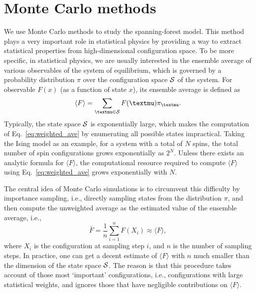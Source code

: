 \section{Monte Carlo methods}\label{sec:MC_intro}
We use Monte Carlo methods to study the spanning-forest model. This method plays a very important role in statistical physics by
providing a way to extract statistical properties from high-dimensional configuration space. To be more specific, in statistical
physics, we are usually interested in the ensemble average of various observables of the system of equilibrium, which is governed by a probability distribution $\pi$ over the configuration space ${\mathcal S}$ of the system. 
For observable $F(x)$ (as a function of state $x$), its ensemble average is defined as
\begin{equation}\label{eq:weighted_ave}
	\langle F \rangle = \sum_{\mu \in \scrS} F(\mu) \pi_\mu.
\end{equation}
Typically, the state space ${\mathcal S}$ is exponentially large, which makes the computation of Eq.~\eqref{eq:weighted_ave} by enumerating all possible states impractical.
Taking the Ising model as an example, for a system with a total of $N$ spins, the total number of spin configurations grows exponentially as $2^N$.
Unless there exists an analytic formula for $\langle F \rangle$, the computational resource required to compute $\langle F \rangle$ 
using Eq.~\eqref{eq:weighted_ave} grows exponentially with $N$.

The central idea of Monte Carlo simulations is to circumvent this difficulty by importance sampling, i.e., directly sampling states from the distribution
$\pi$, and then compute the unweighted average as the estimated value of the ensemble average, i.e.,
\begin{equation}
	\bar{F} = \frac{1}{n}\sum_{i=1}^n F(X_i) \approx \langle F \rangle,
\end{equation}
where $X_i$ is the configuration at sampling step $i$, and $n$ is the number of sampling steps. In practice, one can get a decent estimate of $\langle F \rangle $ with $n$ much smaller
than the dimension of the state space ${\mathcal S}$. The reason is that this procedure takes account of those most `important' configurations,
i.e., configurations with large statistical weights, and ignores those that have negligible contributions on $\langle F \rangle$.

